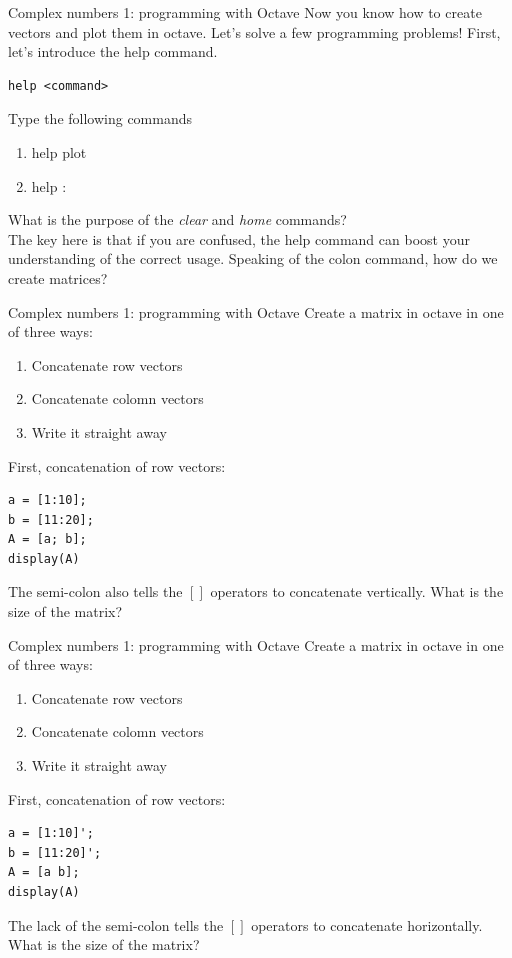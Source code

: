 \documentclass{beamer}
\begin{document}
\begin{frame}[fragile]{Complex numbers 1: programming with Octave}
Now you know how to create vectors and plot them in octave.  Let's solve a few programming problems!  First, let's introduce the \alert{help} command.
\begin{verbatim}
help <command>
\end{verbatim}
Type the following commands
\begin{enumerate}
\item help plot
\item help :
\end{enumerate}
What is the purpose of the \textit{clear} and \textit{home} commands? \\ \vspace{0.5cm}
The key here is that if you are confused, the help command can boost your understanding of the correct usage.  Speaking of the colon command, how do we create matrices?
\end{frame}

\begin{frame}[fragile]{Complex numbers 1: programming with Octave}
\small
Create a matrix in octave in one of three ways:
\begin{enumerate}
\item \alert{Concatenate row vectors}
\item Concatenate colomn vectors
\item Write it straight away
\end{enumerate}
First, concatenation of row vectors:
\begin{verbatim}
a = [1:10];
b = [11:20];
A = [a; b];
display(A)
\end{verbatim}
The semi-colon also tells the $[]$ operators to concatenate vertically.  What is the size of the matrix?
\end{frame}

\begin{frame}[fragile]{Complex numbers 1: programming with Octave}
\small
Create a matrix in octave in one of three ways:
\begin{enumerate}
\item Concatenate row vectors
\item \alert{Concatenate colomn vectors}
\item Write it straight away
\end{enumerate}
First, concatenation of row vectors:
\begin{verbatim}
a = [1:10]';
b = [11:20]';
A = [a b];
display(A)
\end{verbatim}
The lack of the semi-colon tells the $[]$ operators to concatenate horizontally.  What is the size of the matrix?
\end{frame}
\end{document}
